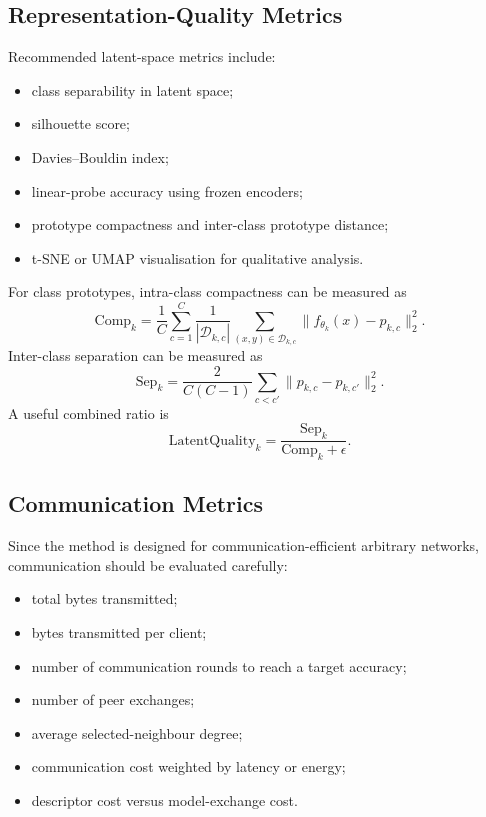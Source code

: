 \documentclass[conference]{IEEEtran}
\begin{document}
\subsection{Representation-Quality Metrics}
\label{subsec:representation-quality-metrics}
Recommended latent-space metrics include:
\begin{itemize}
    \item class separability in latent space;
    \item silhouette score;
    \item Davies--Bouldin index;
    \item linear-probe accuracy using frozen encoders;
    \item prototype compactness and inter-class prototype distance;
    \item t-SNE or UMAP visualisation for qualitative analysis.
\end{itemize}

For class prototypes, intra-class compactness can be measured as
\begin{equation}
    \text{Comp}_k
    =
    \frac{1}{C}
    \sum_{c=1}^{C}
    \frac{1}{|\mathcal{D}_{k,c}|}
    \sum_{(x,y)\in\mathcal{D}_{k,c}}
    \|f_{\theta_k}(x)-p_{k,c}\|_2^2.
    \label{eq:auto-097}
\end{equation}
Inter-class separation can be measured as
\begin{equation}
    \text{Sep}_k
    =
    \frac{2}{C(C-1)}
    \sum_{c<c'}
    \|p_{k,c}-p_{k,c'}\|_2^2.
    \label{eq:auto-098}
\end{equation}
A useful combined ratio is
\begin{equation}
    \text{LatentQuality}_k = \frac{\text{Sep}_k}{\text{Comp}_k+\epsilon}.
    \label{eq:auto-099}
\end{equation}

\subsection{Communication Metrics}
\label{subsec:communication-metrics}
Since the method is designed for communication-efficient arbitrary networks, communication should be evaluated carefully:
\begin{itemize}
    \item total bytes transmitted;
    \item bytes transmitted per client;
    \item number of communication rounds to reach a target accuracy;
    \item number of peer exchanges;
    \item average selected-neighbour degree;
    \item communication cost weighted by latency or energy;
    \item descriptor cost versus model-exchange cost.
\end{itemize}
\end{document}
